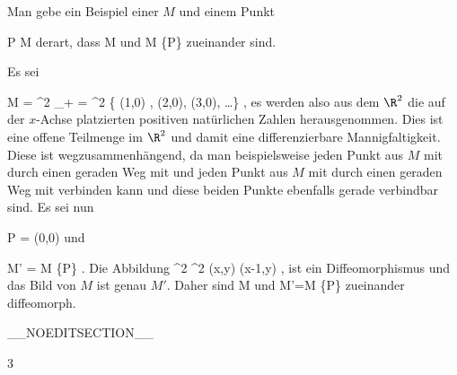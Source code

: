 {

Man gebe ein Beispiel einer
 
$M$ und einem Punkt

\mavergleichskette
{\vergleichskette
{ P
}
{ \in }{ M
}
{  }{
}
{    }{
}
{   }{
}
}
{}{}{}
derart, dass
\mathkor {} {M} {und} {M \setminus \{P\}} {}
zueinander
sind.

}
{

Es sei

\mavergleichskettedisp
{\vergleichskette
{M
}
{ =} { \R^2 \setminus \N_+
}
{ =} { \R^2 \setminus \{ (1,0) , (2,0), (3,0), \ldots  \}
}
{ } {
}
{ } {
}
}
{}{}{,}
es werden also aus dem $\R^2$ die auf der $x$-Achse platzierten positiven natürlichen Zahlen herausgenommen. Dies ist eine offene Teilmenge im $\R^2$ und damit eine differenzierbare Mannigfaltigkeit. Diese ist wegzusammenhängend, da man beispielsweise jeden Punkt aus $M$ mit
 durch einen geraden Weg mit
 und jeden Punkt aus $M$ mit
 durch einen geraden Weg mit
 verbinden kann und diese beiden Punkte ebenfalls gerade verbindbar sind. Es sei nun

\mavergleichskettedisp
{\vergleichskette
{P
}
{ =} { (0,0)
}
{ } {
}
{ } {
}
{ } {
}
}
{}{}{}
und

\mavergleichskettedisp
{\vergleichskette
{M'
}
{ =} { M \setminus \{P\}
}
{ } {
}
{ } {
}
{ } {
}
}
{}{}{.}
Die Abbildung
\maabbeledisp {} {\R^2} {\R^2
} {(x,y)} {(x-1,y)
} {,}
ist
 {} {}
ein Diffeomorphismus und das Bild von $M$ ist genau $M'$. Daher sind
\mathkor {} {M} {und} {M'=M \setminus \{P\}} {}
zueinander diffeomorph.

 }

__NOEDITSECTION__

{3}

